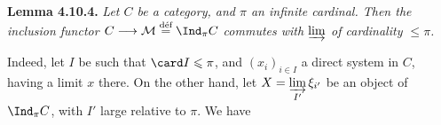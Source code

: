\textbf{Lemma 4.10.4.} \textit{Let $C$ be a category, and $\pi$ an infinite cardinal. Then the inclusion functor $C \longrightarrow \mathcal{M} \overset{\textup{déf}}{=} \Ind_\pi C$ commutes with $\varinjlim$ of cardinality $\leqslant \pi$.}

Indeed, let $I$ be such that $\card I \leqslant \pi$, and $(x_i)_{i\in I}$ a direct system in $C$, having a limit $x$ there. On the other hand, let $X = \varinjlim\limits_{I'} \xi_{i'}$ be an object of $\Ind_\pi C$, with $I'$ large relative to $\pi$. We have
